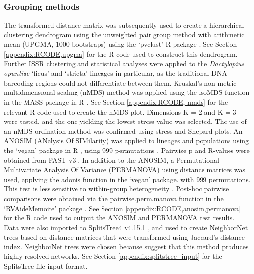 \subsubsection{Grouping methods}
The transformed distance matrix was subsequently used to create a hierarchical clustering dendrogram using the unweighted pair group method with arithmetic mean (UPGMA, 1000 bootstraps) using the `pvclust' R package \citep{suzuki2006pvclust}. See Section \ref{appendix:RCODE,upgma} for the R code used to construct this dendrogram. Further ISSR clustering and statistical analyses were applied to the \textit{Dactylopius opuntiae} `ficus' and `stricta' lineages in particular, as the traditional DNA barcoding regions could not differentiate between them.
Kruskal's non-metric multidimensional scaling (nMDS) method was applied using the isoMDS function in the MASS package in R \citep{MASS_R}. See Section \ref{appendix:RCODE, nmds} for the relevant R code used to create the nMDS plot. Dimensions K = 2 and K = 3 were tested, and the one yielding the lowest stress value was selected. The use of an nMDS ordination method was confirmed using stress and Shepard plots. 
An ANOSIM (ANalysis Of SIMilarity) was applied to lineages and populations using the `vegan' package in R \citep{vegan_R}, using 999 permutations \citep{clarke1993}. Pairwise p and R-values were obtained from PAST v3 \citep{Hammer2001PAST:Analysis}. 
In addition to the ANOSIM, a Permutational Multivariate Analysis Of Variance (PERMANOVA) using distance matrices was used, applying the adonis function in the `vegan' package, with 999 permutations. This test is less sensitive to within-group heterogeneity \citep{anderson2014permutational}. Post-hoc pairwise comparisons were obtained via the pairwise.perm.manova function in the `RVAideMemoire' package \citep{herve2015rvaidememoire}. See Section \ref{appendix:RCODE,anosim,permanova} for the R code used to output the ANOSIM and PERMANOVA test results. \\
Data were also imported to SplitsTree4 v4.15.1 \citep{huson2006splitstree}, and used to create NeighborNet trees based on distance matrices that were transformed using Jaccard's distance index. NeighborNet trees were chosen because \citet{huson2006splitstree} suggest that this method produces highly resolved networks. See Section \ref{appendix:splitstree_input} for the SplitsTree file input format. 

